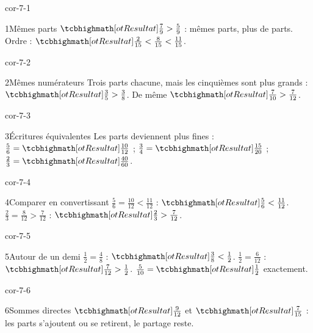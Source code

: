 \clearpage\pagestyle{otMain}\setlength{\otBlocEspacement}{2.5mm}\fontsize{11}{15}\selectfont{}
\begin{blocLivre}{cor-7-1}\begin{corrige}{1}{Mêmes parts}
$\res{\frac79>\frac59}$ : mêmes parts, plus de parts. Ordre : $\res{\frac2{15}<\frac8{15}<\frac{11}{15}}$.
\end{corrige}\end{blocLivre}
\begin{blocLivre}{cor-7-2}\begin{corrige}{2}{Mêmes numérateurs}
Trois parts chacune, mais les cinquièmes sont plus grands : $\res{\frac35>\frac38}$. De même $\res{\frac7{10}>\frac7{12}}$.
\end{corrige}\end{blocLivre}
\begin{blocLivre}{cor-7-3}\begin{corrige}{3}{Écritures équivalentes}
Les parts deviennent plus fines : $\frac56=\res{\frac{10}{12}}$ ; $\frac34=\res{\frac{15}{20}}$ ; $\frac23=\res{\frac{40}{60}}$.
\end{corrige}\end{blocLivre}
\begin{blocLivre}{cor-7-4}\begin{corrige}{4}{Comparer en convertissant}
$\frac56=\frac{10}{12}<\frac{11}{12}$ : $\res{\frac56<\frac{11}{12}}$. $\frac23=\frac8{12}>\frac7{12}$ : $\res{\frac23>\frac7{12}}$.
\end{corrige}\end{blocLivre}
\begin{blocLivre}{cor-7-5}\begin{corrige}{5}{Autour de un demi}
$\frac12=\frac48$ : $\res{\frac38<\frac12}$. $\frac12=\frac6{12}$ : $\res{\frac7{12}>\frac12}$. $\frac5{10}=\res{\frac12}$ exactement.
\end{corrige}\end{blocLivre}
\begin{blocLivre}{cor-7-6}\begin{corrige}{6}{Sommes directes}
$\res{\frac9{12}}$ et $\res{\frac7{15}}$ : les parts s’ajoutent ou se retirent, le partage reste.
\end{corrige}\end{blocLivre}
